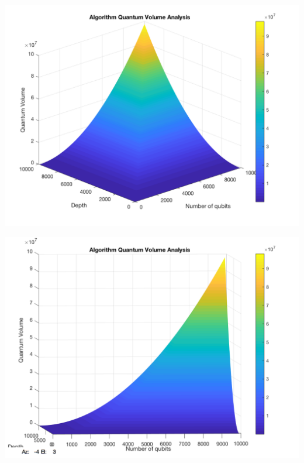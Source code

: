 \documentclass[11pt]{article}
\begin{document}

\begin{minipage}{.45\textwidth}

\centering

\begin{center}
\includegraphics[width=.9\linewidth]{V_q_analysis_sym2.png}
\end{center}

\label{fig:algorithmQV2}

\end{minipage}%
\hspace{1cm}
\begin{minipage}{.45\textwidth}

\begin{center}
\includegraphics[width=.9\linewidth]{V_q_analysis_sym1.png}
\end{center}

\label{fig:algorithmQV1}

\end{minipage}%
\end{document}

